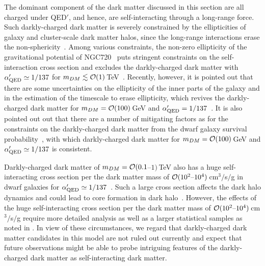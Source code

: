 \documentclass[aps,amsmath,preprint,epsf,superscriptaddress,nofootinbib,notitlepage]{revtex4-1}
\begin{document}
The dominant component of the dark matter discussed in this section are all charged under QED$'$, and hence, are self-interacting 
through a long-range force.
Such darkly-charged dark matter is severely constrained by the ellipticities of galaxy and cluster-scale dark matter halos, 
since the long-range interactions erase the non-sphericity~\cite{Ackerman:mha,Feng:2009mn,Feng:2009hw}. 
Among various constraints, the non-zero ellipticity of the gravitational potential of NGC720~\cite{Buote:2002wd} puts 
stringent constraints on the self-interaction cross section and excludes the darkly-charged
dark matter with $\alpha_{\rm QED}' \simeq 1/137$ for $m_{DM}\lesssim {\cal O}(1)$\,TeV~\cite{Feng:2009mn}.
Recently, however, it is pointed out that there are some uncertainties on the ellipticity of the inner parts of 
the galaxy and in the estimation of the timescale  to erase ellipticity, 
which revives the darkly-charged dark matter for $m_{DM}= {\cal O}(100)$\,GeV and $\alpha_{\rm QED}' =1/137$~\cite{Agrawal:2016quu}.
It is also pointed out out that there are  a number of mitigating factors
as for the constraints on the darkly-charged dark matter from the dwarf galaxy survival probability~\cite{Kahlhoefer:2013dca},
with which darkly-charged dark matter for $m_{DM}= {\cal O}(100)$\,GeV and $\alpha_{\rm QED}' \simeq1/137$ is consistent.

Darkly-charged dark matter of $m_{DM} = {\cal O}(0.1$--$1)$\,TeV also has a huge self-interacting cross section per the dark matter mass 
of ${\cal O}(10^{2}\mbox{--}10^{4})$\,cm$^3/$s$/$g in dwarf galaxies for $\alpha_{\rm QED}' \simeq 1/137$~\cite{Agrawal:2016quu}. 
Such a large cross section affects the dark halo dynamics and could lead to core formation in dark halo~\cite{Kaplinghat:2015aga}. 
However, the effects of the huge self-interacting cross section per the dark matter mass 
of ${\cal O}(10^{2}\mbox{--}10^{4})$\,cm$^3/$s$/$g  require more detailed analysis as well as a larger statistical samples as noted in  \cite{Agrawal:2016quu}.
In view of these circumstances, we regard that darkly-charged dark matter candidates in this model are not ruled out currently 
and expect that future observations might be able to probe  intriguing features of the darkly-charged dark matter as self-interacting dark matter.
\end{document}
